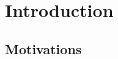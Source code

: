 
\chapter{Introduction}  %
\label{cha:intro}

\ifpdf
    \graphicspath{{Chapter1/Pics/Raster/}{Chapter1/Pics/PDF/}{Chapter1/}}
\else
    \graphicspath{{Chapter1/Pics/Vector/}{Chapter1/}}
\fi



\section{Motivations}
\label{sec:intro_motivations}

